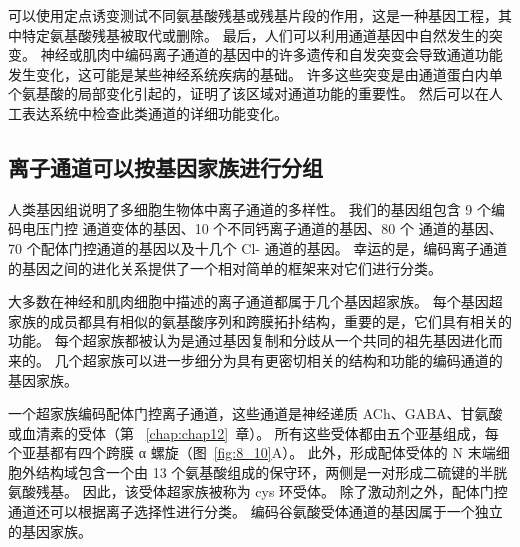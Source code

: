 可以使用定点诱变测试不同氨基酸残基或残基片段的作用，这是一种基因工程，其中特定氨基酸残基被取代或删除。
最后，人们可以利用通道基因中自然发生的突变。
神经或肌肉中编码离子通道的基因中的许多遗传和自发突变会导致通道功能发生变化，这可能是某些神经系统疾病的基础。
许多这些突变是由通道蛋白内单个氨基酸的局部变化引起的，证明了该区域对通道功能的重要性。
然后可以在人工表达系统中检查此类通道的详细功能变化。



\subsection{离子通道可以按基因家族进行分组}

人类基因组说明了多细胞生物体中离子通道的多样性。 我们的基因组包含 9 个编码电压门控  通道变体的基因、10 个不同钙离子通道的基因、80 个  通道的基因、70 个配体门控通道的基因以及十几个 Cl- 通道的基因。
幸运的是，编码离子通道的基因之间的进化关系提供了一个相对简单的框架来对它们进行分类。


大多数在神经和肌肉细胞中描述的离子通道都属于几个基因超家族。
每个基因超家族的成员都具有相似的氨基酸序列和跨膜拓扑结构，重要的是，它们具有相关的功能。
每个超家族都被认为是通过基因复制和分歧从一个共同的祖先基因进化而来的。
几个超家族可以进一步细分为具有更密切相关的结构和功能的编码通道的基因家族。


一个超家族编码配体门控离子通道，这些通道是神经递质 ACh、GABA、甘氨酸或血清素的受体（第 ~\ref{chap:chap12}~章）。 
所有这些受体都由五个亚基组成，每个亚基都有四个跨膜 α 螺旋（图~\ref{fig:8_10}A）。 
此外，形成配体受体的 N 末端细胞外结构域包含一个由 13 个氨基酸组成的保守环，两侧是一对形成二硫键的半胱氨酸残基。
因此，该受体超家族被称为 cys 环受体。
除了激动剂之外，配体门控通道还可以根据离子选择性进行分类。
编码谷氨酸受体通道的基因属于一个独立的基因家族。


